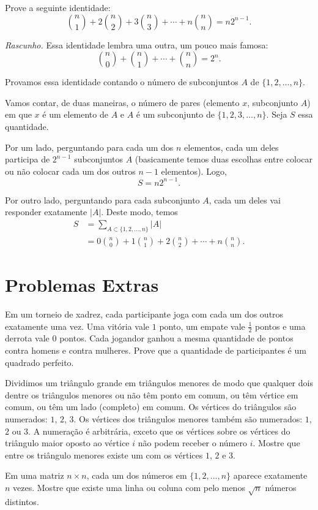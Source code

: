 \documentclass[10pt, a4paper]{article}
\begin{document}
	\begin{prob} %
		Prove a seguinte identidade: \[\binom{n}{1} + 2 \binom{n}{2} + 3 \binom{n}{3} + \cdots + n\binom{n}{n} = n2^{n-1}.\]
	\end{prob}

	\noindent \textit{Rascunho.} Essa identidade lembra uma outra, um pouco mais famosa:
	\[\binom{n}{0} + \binom{n}{1} + \cdots + \binom{n}{n} = 2^n.\]

	Provamos essa identidade contando o número de subconjuntos $A$ de $\{1, 2, \dots, n\}$.

	\begin{sol}
		Vamos contar, de duas maneiras, o número de pares (elemento $x$, subconjunto $A$) em que $x$ é um elemento de $A$ e $A$ é um subconjunto de $\{1, 2, 3, \dots, n\}$. Seja $S$ essa quantidade.
	
		Por um lado, perguntando para cada um dos $n$ elementos, cada um deles participa de $2^{n-1}$ subconjuntos  $A$ (basicamente temos duas escolhas entre colocar ou não colocar cada um dos outros $n-1$ elementos). Logo, \[ S = n2^{n-1}.\]
	
		Por outro lado, perguntando para cada subconjunto $A$, cada um deles vai responder exatamente $|A|$. Deste modo, temos
	\begin{align*}
		S &= \sum_{A \subset \{1, 2, \dots, n\}} |A| \\
		  &= 0 \binom{n}{0} + 1\binom{n}{1} + 2\binom{n}{2} + \cdots + n\binom{n}{n}.
	\end{align*}
	\end{sol}


	\section{Problemas Extras}

	\begin{prob}[OBM] %
		Em um torneio de xadrez, cada participante joga com cada um dos outros exatamente uma vez. Uma vitória vale $1$ ponto, um empate vale $\frac{1}{2}$ pontos e uma derrota vale $0$ pontos. Cada jogandor ganhou a mesma quantidade de pontos contra homens e contra mulheres. Prove que a quantidade de participantes é um quadrado perfeito.
	\end{prob}

	\begin{prob} %
		Dividimos um triângulo grande em triângulos menores de modo que qualquer dois dentre os triângulos menores ou não têm ponto em comum, ou têm vértice em comum, ou têm um lado (completo) em comum. Os vértices do triângulos são numerados: $1$, $2$, $3$. Os vértices dos triângulos menores também são numerados: $1$, $2$ ou $3$. A numeração é arbitrária, exceto que os vértices sobre os vértices do triângulo maior oposto ao vértice $i$ não podem receber o número $i$. Mostre que entre os triângulo menores existe um com os vértices $1$, $2$ e $3$.
	\end{prob}

	\begin{prob}
		Em uma matriz $n \times n$, cada um dos números em $\{1, 2, \dots , n\}$ aparece exatamente $n$ vezes. Mostre que existe uma linha ou coluna com pelo menos $\sqrt{n}$ números distintos.
	\end{prob}
\end{document}
